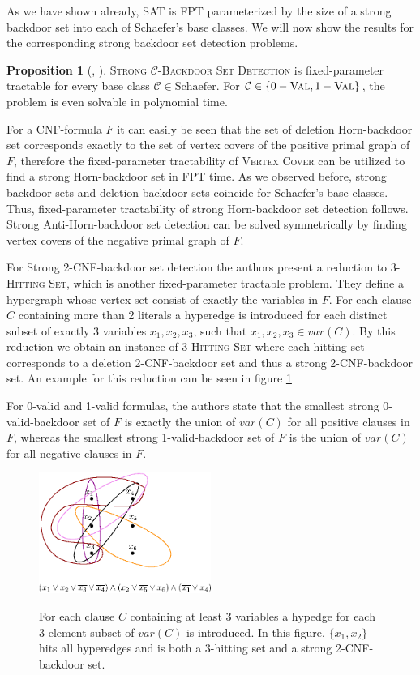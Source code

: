 \documentclass[11pt,a4paper]{article}
\theoremstyle{definition}
\theoremstyle{proposition}
\newtheorem{proposition}{Proposition}[section]
\begin{document}
As we have shown already, SAT is FPT parameterized by the size of a strong backdoor set into each of Schaefer's base classes. We will now show the results for the corresponding strong backdoor set detection problems.
\begin{proposition}[{\cite[Proposition 5, p.297]{Gaspers2012}}, {\cite{Nishimura}}]
\textsc{Strong $\mathcal{C}$-Backdoor Set Detection} is fixed-parameter tractable for every base class $\mathcal{C} \in \text{Schaefer}$. For $\mathcal{C} \in \{0-\textsc{Val}, 1-\textsc{Val}\}$, the problem is even solvable in polynomial time. 
\end{proposition}

For a CNF-formula $F$ it can easily be seen that the set of deletion Horn-backdoor set corresponds exactly to the set of vertex covers of the positive primal graph of $F$, therefore the fixed-parameter tractability of \textsc{Vertex Cover} can be utilized to find a strong Horn-backdoor set in FPT time. As we observed before, strong backdoor sets and deletion backdoor sets coincide for Schaefer's base classes. Thus, fixed-parameter tractability of strong Horn-backdoor set detection follows. Strong Anti-Horn-backdoor set detection can be solved symmetrically by finding vertex covers of the negative primal graph of $F$.  

For Strong 2-CNF-backdoor set detection the authors present a reduction to \textsc{3-Hitting Set}, which is another fixed-parameter tractable problem. They define a hypergraph whose vertex set consist of exactly the variables in $F$. For each clause $C$ containing more than 2 literals a hyperedge is introduced for each distinct subset of exactly 3 variables $x_1,x_2,x_3$, such that $x_1,x_2,x_3 \in var(C)$. By this reduction we obtain an instance of \textsc{3-Hitting Set} where each hitting set corresponds to a deletion 2-CNF-backdoor set and thus a strong 2-CNF-backdoor set. An example for this reduction can be seen in figure \ref{fig:2cnf-to-3hittingset}

For 0-valid and 1-valid formulas, the authors state that the smallest strong 0-valid-backdoor set of $F$ is exactly the union of $var(C)$ for all positive clauses in $F$, whereas the smallest strong 1-valid-backdoor set of $F$ is the union of $var(C)$ for all negative clauses in $F$. 

\begin{figure}
        \centering
        \includegraphics[width=0.5\textwidth]{figures/hitting_set.eps}
        \label{fig:2cnf-to-3hittingset}
	\caption{For each clause $C$ containing at least 3 variables a hypedge for each 3-element subset of $var(C)$ is introduced. In this figure, $\{x_1, x_2\}$ hits all hyperedges and is both a 3-hitting set and a strong 2-CNF-backdoor set.}
\end{figure}
\end{document}
